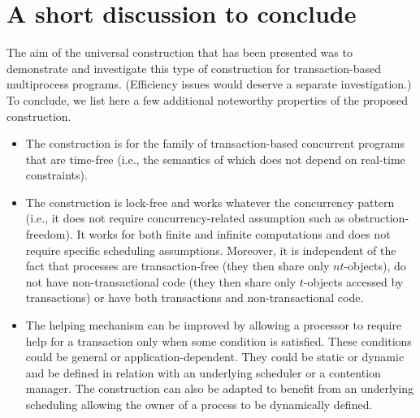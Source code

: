 
\section{A short discussion  to conclude}
\label{sec:discussion} 
\label{sec:conclusion}

The aim of the universal construction that has been presented 
was to demonstrate and investigate this type of construction for
transaction-based multiprocess programs. (Efficiency issues 
would deserve  a separate investigation.) To  conclude, we list  here a few
additional noteworthy properties of the proposed  construction. 

\begin{itemize}
\item  The construction is for the family of transaction-based concurrent
programs  that are time-free (i.e., the semantics of which does not depend 
on real-time constraints). 
\item 
The construction  is lock-free and  works whatever the concurrency pattern
(i.e., it does not require concurrency-related  assumption such as 
obstruction-freedom). It  works for  both finite  and  infinite
computations and does not require  specific scheduling assumptions.  
%
Moreover,  it is  independent of the fact that 
processes  are  transaction-free (they then share  only
$nt$-objects),  do not have  non-transactional code (they then  share 
only $t$-objects  accessed by transactions)  or have both  transactions and
non-transactional code.  
%
%
\item  
The helping mechanism can be improved by allowing a processor to 
require help for a transaction only when  some condition is satisfied. 
These  conditions could be general or application-dependent. They could 
be static or dynamic and  be  defined in relation with an underlying
scheduler or a contention manager. 
%
The construction can also be  adapted  to benefit from an underlying 
scheduling allowing the owner of a process to be  dynamically defined.  


\end{itemize}
